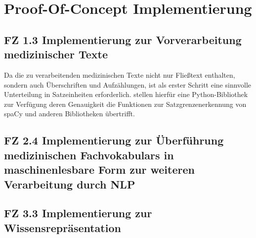 \chapter{Proof-Of-Concept Implementierung}
\label{ch:implementierung}


\section{FZ 1.3 Implementierung zur Vorverarbeitung medizinischer Texte}
\label{sec:FZ1.3} 

Da die zu verarbeitenden medizinischen Texte nicht nur Fließtext enthalten, sondern auch Überschriften und Aufzählungen, ist als erster Schritt eine sinnvolle Unterteilung in Satzeinheiten erforderlich. \cite{sadvilkar_pysbd_2020} stellen hierfür eine Python-Bibliothek zur Verfügung deren Genauigkeit die Funktionen zur Satzgrenzenerkennung von spaCy und anderen Bibliotheken übertrifft.

\section{FZ 2.4 Implementierung zur Überführung medizinischen Fachvokabulars in maschinenlesbare Form zur weiteren Verarbeitung durch NLP}
\label{sec:FZ2.4} 

\section{FZ 3.3 Implementierung zur Wissensrepräsentation}
\label{sec:FZ3.3} 

